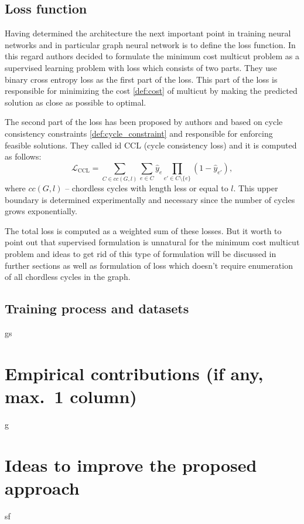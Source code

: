 \documentclass[10pt, twocolumn, a4paper]{article}
\theoremstyle{definition}
\begin{document}
\subsection{Loss function}
Having determined the architecture the next important point in training neural networks and
in particular graph neural network is to define the loss function. In this regard authors decided
to formulate the minimum cost multicut problem as a supervised learning problem with loss which consists of two parts.
They use binary cross entropy loss as the first part of the loss. This part of the loss is responsible for
minimizing the cost \eqref{def:cost} of multicut by making the predicted solution as
close as possible to optimal.

The second part of the loss has been proposed by authors and based on cycle consistency constraints \eqref{def:cycle_constraint}
and responsible for enforcing feasible solutions. They called id CCL (cycle consistency loss) and it is computed as follows:
\begin{equation} \label{eq:ccl}
    \mathcal{L}_{\text{CCL}} = \sum\limits_{C \in cc(G, l)} \sum\limits_{e \in C} \hat{y}_e
    \prod\limits_{e' \in C \setminus \{e\}} (1 - \hat{y}_{e'}),
\end{equation}
where $cc(G, l)$ -- chordless cycles with length less or equal to $l$. This upper boundary is determined
experimentally and necessary since the number of cycles grows exponentially.

The total loss is computed as a weighted sum of these losses. But it worth to point out that supervised
formulation is unnatural for the minimum cost multicut problem and ideas to get rid of this type of
formulation will be discussed in further sections as well as formulation of loss which doesn't require
enumeration of all chordless cycles in the graph.

\subsection{Training process and datasets}
gs

\section{Empirical contributions (if any, max.~1 column)}
g

\section{Ideas to improve the proposed approach}
sf
\end{document}
